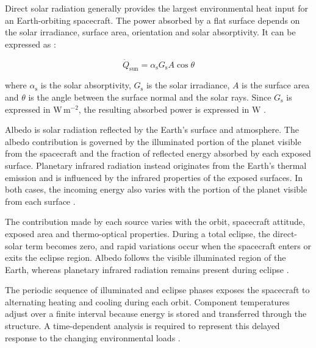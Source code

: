 Direct solar radiation generally provides the largest environmental heat input for an 
Earth-orbiting spacecraft. The power absorbed by a flat surface depends on the solar 
irradiance, surface area, orientation and solar absorptivity. It can be expressed as 
\cite{spacethctrl}:

\begin{equation}
    \dot{Q}_{\mathrm{sun}}
    =
    \alpha_{\mathrm{s}}G_{\mathrm{s}}A\cos\theta
    \label{eq:absorbed_solar_power}
\end{equation}

where $\alpha_{\mathrm{s}}$ is the solar absorptivity, $G_{\mathrm{s}}$ is the solar 
irradiance, $A$ is the surface area and $\theta$ is the angle between the surface normal 
and the solar rays. Since $G_{\mathrm{s}}$ is expressed in $\mathrm{W\,m^{-2}}$, the 
resulting absorbed power is expressed in $\mathrm{W}$ 
\cite{spacethctrl}.

Albedo is solar radiation reflected by the Earth's surface and atmosphere. The albedo 
contribution is governed by the illuminated portion of the planet visible from the spacecraft 
and the fraction of reflected energy absorbed by each exposed surface. Planetary 
infrared radiation instead originates from the Earth's thermal emission and is influenced by 
the infrared properties of the exposed surfaces. In both cases, the incoming energy also 
varies with the portion of the planet visible from each surface 
\cite{spacethctrl,th_handbook}.

The contribution made by each source varies with the orbit, spacecraft attitude, exposed 
area and thermo-optical properties. During a total eclipse, the direct-solar term becomes 
zero, and rapid variations occur when the spacecraft enters 
or exits the eclipse region. Albedo follows the visible illuminated region of the Earth, 
whereas planetary infrared radiation remains present during eclipse 
\cite{spacethctrl,ecss_man}.

The periodic sequence of illuminated and eclipse phases exposes the spacecraft to 
alternating heating and cooling during each orbit. Component temperatures adjust over 
a finite interval because energy is stored and transferred through the structure. A 
time-dependent analysis is required to represent this delayed response to the changing 
environmental loads 
\cite{spacethctrl,th_handbook}.

